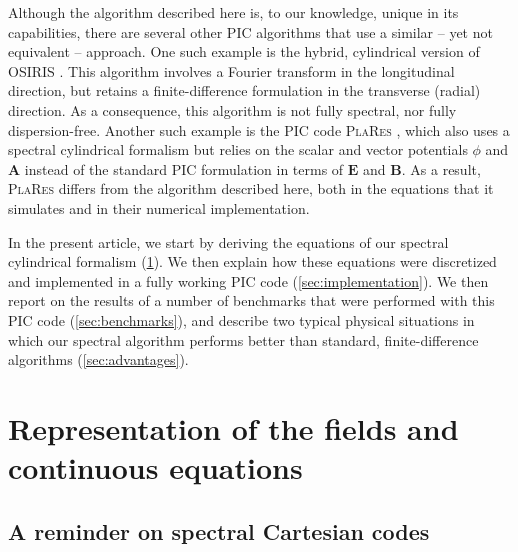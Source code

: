 \documentclass[a4paper]{article}   	%
\renewcommand{\vec}[1]{\boldsymbol{#1}}
\begin{document}
Although the algorithm described here is, to our knowledge, unique in
its capabilities, there are several other PIC algorithms that use 
a similar -- yet not equivalent -- approach. One such example is the
hybrid, cylindrical version of \textsc{OSIRIS} \citep{Yuarxiv2015}. This algorithm
involves a Fourier transform in the longitudinal direction, but
retains a finite-difference formulation in the transverse (radial)
direction. As a consequence, this algorithm is not fully spectral, nor
fully dispersion-free. Another such example is the PIC code \textsc{PlaRes} 
\citep{AndriyashJCP2015}, which also uses a spectral cylindrical
formalism but relies on the scalar and vector potentials
$\phi$ and $\vec{A}$ instead of the standard PIC formulation in terms
of $\vec{E}$ and $\vec{B}$. As a result, \textsc{PlaRes} differs from the
algorithm described here, both in the equations that it simulates and
in their numerical implementation.

In the present article, we start by deriving the equations of our
spectral cylindrical formalism (\cref{sec:theory}). We then explain
how these equations were discretized and implemented in a fully
working PIC code (\cref{sec:implementation}). We then report on the
results of a number of benchmarks that were performed with this PIC
code (\cref{sec:benchmarks}), and describe two typical physical situations in
which our spectral algorithm performs better than standard,
finite-difference algorithms (\cref{sec:advantages}).

\section{Representation of the fields and continuous equations}
\label{sec:theory}

\subsection{A reminder on spectral Cartesian codes}
\end{document}
